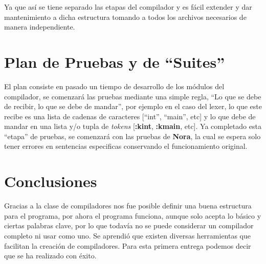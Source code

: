 \documentclass{article}
\begin{document}
Ya que así se tiene separado las etapas del compilador y es fácil extender y dar mantenimiento a dicha
estructura tomando a todos los archivos necesarios de manera independiente.

\section{Plan de Pruebas y de ``Suites''}

El plan consiste en pasado un tiempo de desarrollo de los módulos del
compilador, se comenzará las pruebas mediante una  simple regla, ``Lo
que se debe de recibir, lo que se debe de mandar'', por ejemplo en el
caso del lexer, lo que este recibe es una lista de cadenas de caracteres
[``int'', ``main'', etc] y lo que debe de mandar en una lista y/o tupla de
\textit{tokens} [\textbf{:kint}, \textbf{:kmain}, etc]. Ya completado esta ``etapa''
de pruebas, se comenzará con las pruebas de \textbf{Nora}, la cual se espera solo
tener errores en sentencias especificas conservando el funcionamiento original.

\section{Conclusiones}

Gracias a la clase de compiladores nos fue posible definir una buena estructura
para el programa, por ahora el programa funciona, aunque solo acepta lo básico
y ciertas palabras clave, por lo que todavía no se puede considerar un compilador
completo ni usar como uno. Se aprendió que existen diversas herramientas que
facilitan la creación de compiladores. Para esta primera entrega podemos decir
que se ha realizado con éxito.
\end{document}
